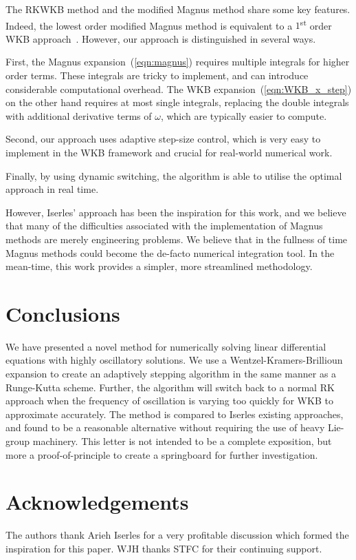 The RKWKB method and the modified Magnus method share some key features. Indeed, the lowest order modified Magnus method is equivalent to a $1$\textsuperscript{st} order WKB approach~\citep{Iserles02globalerror}. However, our approach is distinguished in several ways. 

First, the Magnus expansion~(\ref{eqn:magnus}) requires multiple integrals for higher order terms. These integrals are tricky to implement, and can introduce considerable computational overhead. The WKB expansion~(\ref{eqn:WKB_x_step}) on the other hand requires at most single integrals, replacing the double integrals with additional derivative terms of $\omega$, which are typically easier to compute.

Second, our approach uses adaptive step-size control, which is very easy to implement in the WKB framework and crucial for real-world numerical work.

Finally, by using dynamic switching, the algorithm is able to utilise the optimal approach in real time.

However, Iserles' approach has been the inspiration for this work, and we believe that many of the difficulties associated with the implementation of Magnus methods are merely engineering problems. We believe that in the fullness of time Magnus methods could become the de-facto numerical integration tool. In the mean-time, this work provides a simpler, more streamlined methodology.


\section{Conclusions}



We have presented a novel method for numerically solving linear differential equations with highly oscillatory solutions. We use a Wentzel-Kramers-Brillioun expansion to create an adaptively stepping algorithm in the same manner as a Runge-Kutta scheme. Further, the algorithm will switch back to a normal RK approach when the frequency of oscillation is varying too quickly for WKB to approximate accurately. The method is compared to Iserles existing approaches, and found to be a reasonable alternative without requiring the use of heavy Lie-group machinery. This letter is not intended to be a complete exposition, but more a proof-of-principle to create a springboard for further investigation.

\section*{Acknowledgements}
The authors thank Arieh Iserles for a very profitable discussion which formed the inspiration for this paper. WJH thanks STFC for their continuing support.


